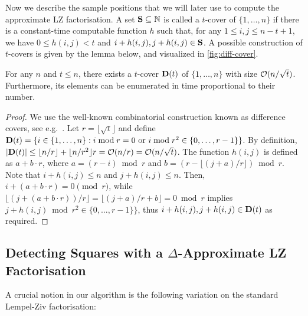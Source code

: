 Now we describe the sample positions that we will later use to compute the approximate LZ factorisation. 
A set ${\bf S}\subseteq \mathbb N$ is called a $t$-cover of $\{1,\ldots,n\}$ if there is a constant-time computable function $h$
such that, for any $1\leq i,j\leq n-t+1$, we have $0\leq h(i,j)<t$ and $i+h(i,j),j+h(i,j)\in {\bf S}$.
A possible construction of $t$-covers is given by the lemma below, and visualized in \cref{fig:diff-cover}.

\begin{lemma}
\label{lem:cover}
For any $n$ and $t\leq n$, there exists a $t$-cover ${\bf D}(t)$ of $\{1,\ldots,n\}$ with size $\mathcal{O}(n/\sqrt{t})$.
Furthermore, its elements can be enumerated in time proportional to their number.
\end{lemma}

\begin{proof}
We use the well-known combinatorial construction known as difference covers, see e.g.~\cite{Maekawa1985}.
Let $r=\lfloor \sqrt{t}\rfloor$ and define ${\bf D}(t)=\{ i\in\{1,\ldots,n\} : i\bmod r = 0 \text { or } i\bmod r^{2} \in \{ 0,\ldots,r-1 \} \}$.
By definition, $|{\bf D}(t)| \leq \lfloor n/r \rfloor + \lfloor n/r^{2} \rfloor r = \mathcal{O}(n/r) = \mathcal{O}(n/\sqrt{t})$.
The function $h(i,j)$ is defined as $a+b\cdot r$, where $a=(r-i)\bmod r$ and $b=(r-\lfloor (j+a)/r \rfloor )\bmod r$.
Note that $i+h(i,j) \leq n$ and $j+h(i,j) \leq n$.
Then, $i+(a+b\cdot r) = 0 \pmod r$, while $\lfloor (j+(a+b\cdot r))/r \rfloor = \lfloor (j+a)/r + b\rfloor = 0 \bmod r$
implies $j+h(i,j) \bmod r^{2} \in \{ 0,\ldots,r-1 \} \}$,
thus $i+h(i,j),j+h(i,j)\in {\bf D}(t)$ as required.
\end{proof}


\subsection[Detecting Squares with a Delta-Approximate LZ Factorisation]{Detecting Squares with a \boldmath$\Delta$\unboldmath-Approximate LZ Factorisation}

A crucial notion in our algorithm is the following variation on the standard Lempel-Ziv factorisation:

